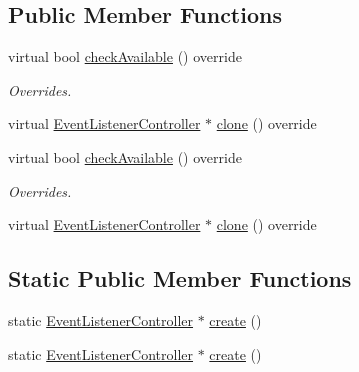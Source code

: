 \subsection*{Public Member Functions}
\begin{DoxyCompactItemize}
\item 
\mbox{\label{classEventListenerController_a82ea8138d323671c6811b69deb297da7}} 
virtual bool \hyperlink{classEventListenerController_a82ea8138d323671c6811b69deb297da7}{check\+Available} () override
\begin{DoxyCompactList}\small\item\em Overrides. \end{DoxyCompactList}\item 
virtual \hyperlink{classEventListenerController}{Event\+Listener\+Controller} $\ast$ \hyperlink{classEventListenerController_ae4960229437589034e72b5c3dbb4a5c7}{clone} () override
\item 
\mbox{\label{classEventListenerController_af3f384634b0fa0e0f9d5c3f152aef42b}} 
virtual bool \hyperlink{classEventListenerController_af3f384634b0fa0e0f9d5c3f152aef42b}{check\+Available} () override
\begin{DoxyCompactList}\small\item\em Overrides. \end{DoxyCompactList}\item 
virtual \hyperlink{classEventListenerController}{Event\+Listener\+Controller} $\ast$ \hyperlink{classEventListenerController_a10c944bc699aac977f85d8b8bdc65e15}{clone} () override
\end{DoxyCompactItemize}
\subsection*{Static Public Member Functions}
\begin{DoxyCompactItemize}
\item 
static \hyperlink{classEventListenerController}{Event\+Listener\+Controller} $\ast$ \hyperlink{classEventListenerController_ac82877a08d0ed41a51b7e27d4232fee4}{create} ()
\item 
static \hyperlink{classEventListenerController}{Event\+Listener\+Controller} $\ast$ \hyperlink{classEventListenerController_ae5ee6f1ac95d7711e488c6b34f5ef128}{create} ()
\end{DoxyCompactItemize}
